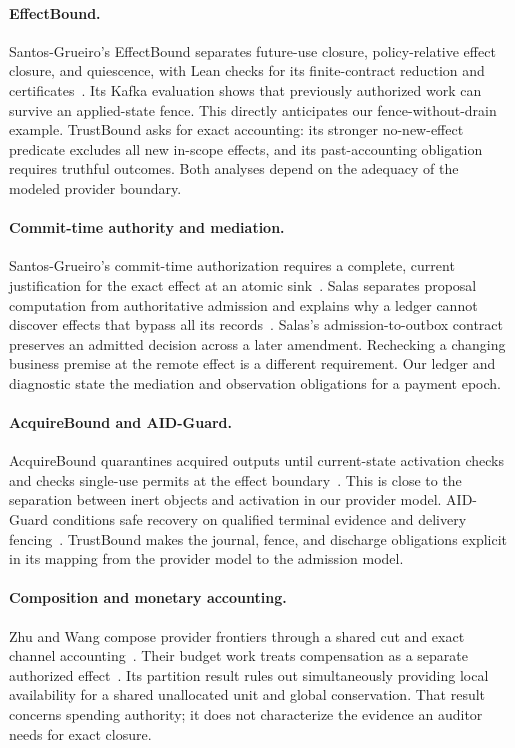 \documentclass[11pt]{article}
\begin{document}
\paragraph{EffectBound.}
Santos-Grueiro's EffectBound separates future-use closure, policy-relative effect
closure, and quiescence, with Lean checks for its finite-contract reduction and
certificates~\cite{effectbound}. Its Kafka evaluation shows that previously
authorized work can survive an applied-state fence. This directly anticipates
our fence-without-drain example. TrustBound asks for exact accounting:
its stronger no-new-effect predicate excludes all new in-scope effects, and its
past-accounting obligation requires truthful outcomes. Both analyses depend on
the adequacy of the modeled provider boundary.

\paragraph{Commit-time authority and mediation.}
Santos-Grueiro's commit-time authorization requires a complete, current
justification for the exact effect at an atomic sink~\cite{cta}.
Salas separates proposal computation from
authoritative admission and explains why a ledger cannot discover effects that
bypass all its records~\cite{salas}. Salas's admission-to-outbox contract preserves
an admitted decision across a later amendment. Rechecking a changing business
premise at the remote effect is a different requirement. Our ledger and diagnostic
state the mediation and observation obligations for a payment epoch.

\paragraph{AcquireBound and AID-Guard.}
AcquireBound quarantines acquired outputs until current-state activation checks
and checks single-use permits at the effect boundary~\cite{acquirebound}.
This is close to the separation between inert objects and activation in our
provider model. AID-Guard conditions safe recovery on qualified terminal
evidence and delivery fencing~\cite{aid}. TrustBound makes the journal, fence,
and discharge obligations explicit in its mapping from the provider model to
the admission model.

\paragraph{Composition and monetary accounting.}
Zhu and Wang compose provider frontiers through a shared cut and exact channel
accounting~\cite{quiescence}. Their budget work treats compensation as a separate
authorized effect~\cite{budget}. Its partition result rules out simultaneously
providing local availability for a shared unallocated unit and global conservation.
That result concerns spending authority; it does not characterize the evidence
an auditor needs for exact closure.
\end{document}
